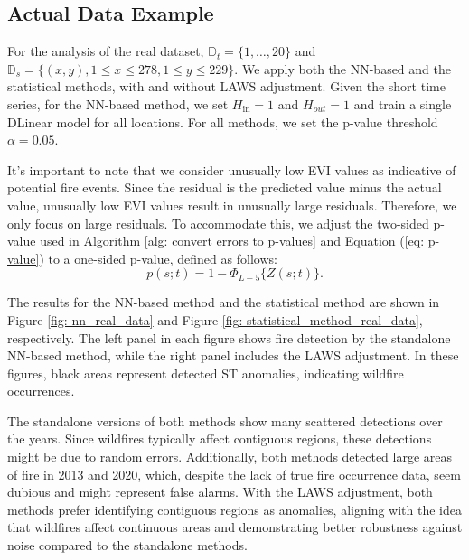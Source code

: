 \documentclass[11pt]{article}
\begin{document}
\subsection{Actual Data Example}
For the analysis of the real dataset, $\mathbb{D}_t=\{1, \ldots, 20\}$ and $\mathbb{D}_s=\{(x, y), 1 \leq x \leq 278, 1 \leq y \leq 229\}$. We apply both the NN-based and the statistical methods, with and without LAWS adjustment. Given the short time series, for the NN-based method, we set $H_{\mathrm{in}}=1$ and $H_{out}=1$ and train a single DLinear model for all locations. For all methods, we set the p-value threshold $\alpha=0.05$.

 It's important to note that we consider unusually low EVI values as indicative of potential fire events. Since the residual is the predicted value minus the actual value, unusually low EVI values result in unusually large residuals. Therefore, we only focus on large residuals. To accommodate this, we adjust the two-sided p-value used in Algorithm \ref{alg: convert errors to p-values} and Equation (\ref{eq: p-value}) to a one-sided p-value, defined as follows:
\begin{equation}\label{eq: one-sided p-value}
	p(s;t)= 1-\Phi_{L-5}\{Z(s;t)\}.
\end{equation}



The results for the NN-based method and the statistical method are shown in Figure \ref{fig: nn_real_data} and Figure \ref{fig: statistical_method_real_data}, respectively. The left panel in each figure shows fire detection by the standalone NN-based method, while the right panel includes the LAWS adjustment. In these figures, black areas represent detected ST anomalies, indicating wildfire occurrences.

The standalone versions of both methods show many scattered detections over the years. Since wildfires typically affect contiguous regions, these detections might be due to random errors. Additionally, both methods detected large areas of fire in 2013 and 2020, which, despite the lack of true fire occurrence data, seem dubious and might represent false alarms. With the LAWS adjustment, both methods prefer identifying contiguous regions as anomalies, aligning with the idea that wildfires affect continuous areas and demonstrating better robustness against noise compared to the standalone methods.
\end{document}
